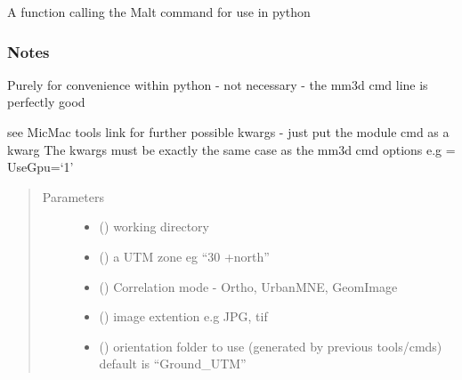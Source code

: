 \documentclass[letterpaper,10pt,english]{sphinxmanual}
\begin{document}
\begin{fulllineitems}
\label{\detokenize{pycmac:dense_match.Malt}}
A function calling the Malt command for use in python
\subsubsection*{Notes}

Purely for convenience within python - not  necessary - the mm3d cmd line
is perfectly good

see MicMac tools link for further possible kwargs - just put the module cmd as a kwarg
The kwargs must be exactly the same case as the mm3d cmd options
e.g = UseGpu=‘1’
\begin{quote}\begin{description}
\item[{Parameters}] \leavevmode\begin{itemize}
\item {} 
 () \textendash{} working directory

\item {} 
 () \textendash{} a UTM zone eg “30 +north”

\item {} 
 () \textendash{} Correlation mode - Ortho, UrbanMNE, GeomImage

\item {} 
 () \textendash{} image extention e.g JPG, tif

\item {} 
 () \textendash{} orientation folder to use (generated by previous tools/cmds)
default is “Ground\_UTM”

\end{itemize}

\end{description}\end{quote}

\end{fulllineitems}

\end{document}
